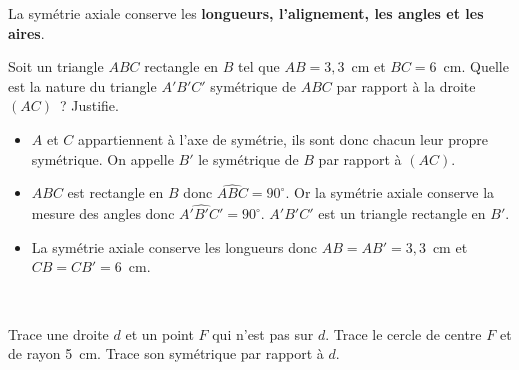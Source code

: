 \begin{methode*1}

\begin{aconnaitre}
La symétrie axiale conserve les \textbf{longueurs, l'alignement, les angles et les aires}.
\end{aconnaitre}

\begin{exemple*1}
Soit un triangle $ABC$ rectangle en $B$ tel que $AB = 3,3$ cm et $BC = 6$ cm. Quelle est la nature du triangle $A'B'C'$ symétrique de $ABC$ par rapport à la droite $(AC)$ ? Justifie. \\[0.5em]
\begin{minipage}[c]{0.4\linewidth}
  \qquad
 \end{minipage}
 \begin{minipage}[c]{0.56\linewidth}
 \begin{itemize}
  \item $A$ et $C$ appartiennent à l'axe de symétrie, ils sont donc chacun leur propre symétrique. On appelle $B'$ le symétrique de $B$ par rapport à $(AC)$.
  \item $ABC$ est rectangle en $B$ donc $\widehat{ABC} = 90^{\circ}$. Or la symétrie axiale conserve la mesure des angles donc $\widehat{A'B'C'} = 90^{\circ}$. $A'B'C'$ est un triangle rectangle en $B'$.
  \item La symétrie axiale conserve les longueurs donc $AB = AB' = 3,3$ cm et $CB = CB' = 6$ cm.
  \end{itemize}
 \end{minipage} \\
 \end{exemple*1}


\exercice
Trace une droite $d$ et un point $F$ qui n'est pas sur $d$. Trace le cercle de centre $F$ et de rayon 5 cm. Trace son symétrique par rapport à $d$.
 
\end{methode*1}


